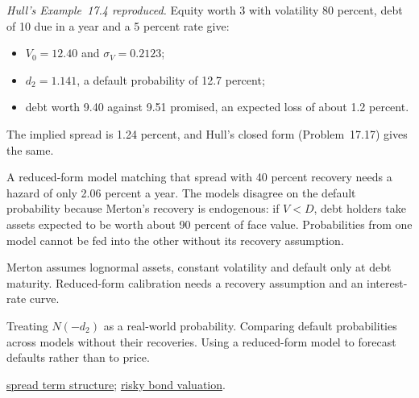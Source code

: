 \begin{qfmodel}
 \emph{Hull's Example~17.4 reproduced.} Equity worth 3 with volatility 80 percent, debt of 10 due in a year and a 5 percent rate give:
\begin{itemize}
\item $V_0=12.40$ and $\sigma_V=0.2123$;
\item $d_2=1.141$, a default probability of 12.7 percent;
\item debt worth 9.40 against 9.51 promised, an expected loss of about 1.2 percent.
\end{itemize}
The implied spread is 1.24 percent, and Hull's closed form (Problem~17.17) gives the same.

A reduced-form model matching that spread with 40 percent recovery needs a hazard of only 2.06 percent a year. The models disagree on the default probability because Merton's recovery is endogenous: if $V<D$, debt holders take assets expected to be worth about 90 percent of face value. Probabilities from one model cannot be fed into the other without its recovery assumption.

 Merton assumes lognormal assets, constant volatility and default only at debt maturity. Reduced-form calibration needs a recovery assumption and an interest-rate curve.

 Treating $N(-d_2)$ as a real-world probability. Comparing default probabilities across models without their recoveries. Using a reduced-form model to forecast defaults rather than to price.

 \hyperref[meth:credit-spread-term-structure]{spread term structure}; \hyperref[meth:risky-bond-cva]{risky bond valuation}.

\end{qfmodel}

